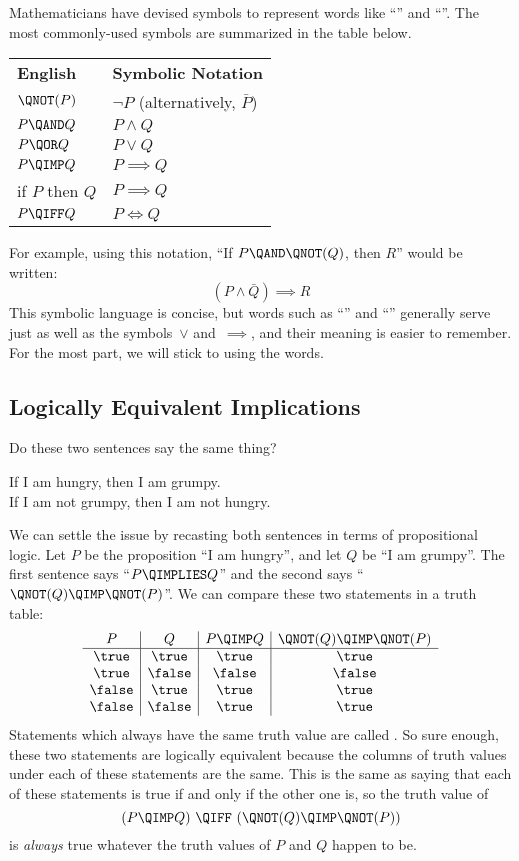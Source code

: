 Mathematicians have devised symbols to represent words like ``\QAND''
and ``\QNOT''.  The most commonly-used symbols are summarized in the
table below.
%
\begin{center}
\begin{tabular}{ll}
\textbf{English} & \textbf{Symbolic Notation} \\[1ex]
$\QNOT(P)$ & $\neg P$ \quad (alternatively, $\bar{P}$) \\
$P \QAND Q$ & $P \land Q$ \\
$P \QOR Q$ & $P \lor Q$ \\
$P \QIMP Q$ & $P \implies Q$ \\
if $P$ then $Q$ & $P \implies Q$ \\
$P \QIFF Q$ & $P \iff Q$
\end{tabular}
\end{center}
%
For example, using this notation, ``If $P \QAND \QNOT(Q)$, then $R$''
would be written:
%
\[
    (P \land \bar{Q}) \implies R
\]
This symbolic language is concise, but words such as ``\QOR'' and
``\QIMPLIES'' generally serve just as well as the symbols~$\lor$
and~$\implies$, and their meaning is easier to remember.  For the most
part, we will stick to using the words.

\subsection{Logically Equivalent Implications}\label{sec:logical_equivalence}

Do these two sentences say the same thing?
%
\begin{center}
If I am hungry, then I am grumpy. \\
If I am not grumpy, then I am not hungry.
\end{center}
%
We can settle the issue by recasting both sentences in terms of
propositional logic.
Let $P$ be the proposition ``I am hungry'', and let $Q$ be ``I am
grumpy''.  The first sentence says ``$P \QIMPLIES Q$'' and the second
says ``$\QNOT(Q) \QIMP \QNOT(P)$''.  We can compare these two
statements in a truth table:
%
\[
\begin{array}{c|c|c|c}
P & Q &
    P \QIMP Q &
    \QNOT(Q) \QIMP \QNOT(P) \\ \hline
\true & \true & \true & \true \\
\true & \false & \false & \false \\
\false & \true & \true & \true \\
\false & \false & \true & \true
\end{array}
\]
%
Statements which always have the same truth value are called
.  So sure enough, these two statements are
logically equivalent because the columns of truth values under each of
these statements are the same.   This is the same as
saying that each of these statements is true if and only if the other one
is, so the truth value of
\[
(P \QIMP Q)\ \QIFF\ (\QNOT(Q) \QIMP \QNOT(P))
\]
is \emph{always} true whatever the truth values of $P$ and $Q$ happen to
be.

